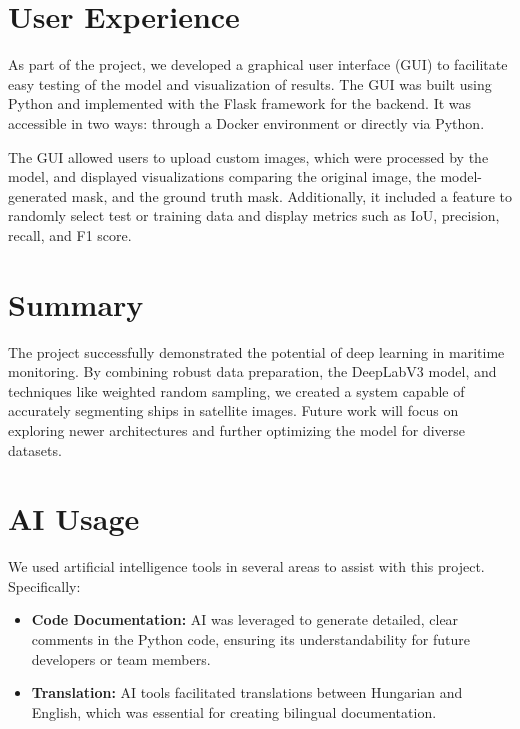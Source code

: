 \documentclass{article}
\begin{document}
\section{User Experience}

As part of the project, we developed a graphical user interface (GUI) to facilitate easy testing of the model and visualization of results. The GUI was built using Python and implemented with the Flask framework for the backend. It was accessible in two ways: through a Docker environment or directly via Python.

The GUI allowed users to upload custom images, which were processed by the model, and displayed visualizations comparing the original image, the model-generated mask, and the ground truth mask. Additionally, it included a feature to randomly select test or training data and display metrics such as IoU, precision, recall, and F1 score.

\section{Summary}

The project successfully demonstrated the potential of deep learning in maritime monitoring. By combining robust data preparation, the DeepLabV3 model, and techniques like weighted random sampling, we created a system capable of accurately segmenting ships in satellite images. Future work will focus on exploring newer architectures and further optimizing the model for diverse datasets.

\section{AI Usage}

We used artificial intelligence tools in several areas to assist with this project. Specifically:
\begin{itemize}
    \item \textbf{Code Documentation:} AI was leveraged to generate detailed, clear comments in the Python code, ensuring its understandability for future developers or team members.
    \item \textbf{Translation:} AI tools facilitated translations between Hungarian and English, which was essential for creating bilingual documentation.
\end{itemize}
\end{document}
